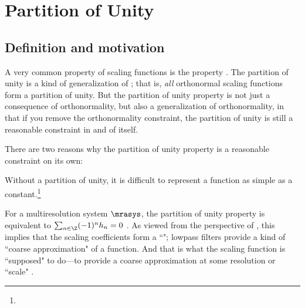 


\chapter{Partition of Unity}
\label{chp:pounity}

\section{Definition and motivation}

A very common property of scaling functions  is the  property .
The partition of unity is a kind of generalization of ;
that is, \emph{all} orthonormal scaling functions form a partition of unity.
But the partition of unity property is not just a consequence of orthonormality, but
also a generalization of orthonormality, in that if you remove the
orthonormality constraint, the partition of unity is still a
reasonable constraint in and of itself.

There are two reasons why the partition of unity property is a reasonable
constraint on its own:
\begin{liste}
   \item Without a partition of unity, it is difficult to represent a function as simple as a
         constant.\footnote{}

  \item For a multiresolution system $\mrasys$, the partition of unity property is equivalent to
        $\sum_{n\in\Z} (-1)^n h_n = 0$ .
        As viewed from the perspective of  ,
        this implies that the scaling coefficients form a ``";
        lowpass filters provide a kind of ``coarse approximation"
        of a function. And that is what the scaling function is ``supposed" to do---to provide a coarse approximation
        at some resolution or ``scale" .
\end{liste}

